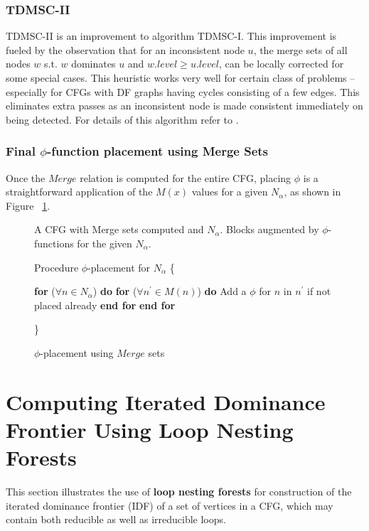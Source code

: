 \subsubsection{TDMSC-II}

TDMSC-II is an improvement to algorithm TDMSC-I. This improvement is fueled by the observation that for an inconsistent node $u$, the merge sets of all nodes $w$ s.t. $w$ dominates $u$ and $w.level \geq u.level$,
can be locally corrected for some special cases. This
heuristic works very well for certain class of problems -- especially for CFGs with DF graphs having cycles consisting of a few edges. This eliminates extra passes as an inconsistent node is made consistent immediately on being detected. For details of this algorithm refer to \cite{}.

\subsubsection { Final $\phi$-function placement using Merge Sets }
Once the $Merge$ relation is computed for the entire CFG, placing $\phi$ is a straightforward application of the $M(x)$ values for a given $N_{\alpha}$, as shown in Figure ~\ref{F:phip}.
\begin{figure}[!ht]
\centering
\begin{minipage}[t]{5in}
 A CFG with Merge sets computed and $N_{\alpha}$.
 Blocks augmented by $\phi$-functions for the given $N_{\alpha}$.

\setcounter{linectr}{0}

Procedure $\phi$-placement for $N_{\alpha}$
\{
\begin{code}
 {\bf for} ($\forall n \in N_{\alpha}$) {\bf do}
   {\bf for} ($\forall n^{'} \in M(n)$) {\bf do}
       Add a $\phi$ for $n$ in $n^{'}$ if not placed already
   {\bf end for}
 {\bf end for}
\end{code}
\}
\end{minipage}
\caption{$\phi$-placement using $Merge$ sets}
\label{F:phip}
\end{figure} 

\section{Computing Iterated Dominance Frontier Using Loop Nesting Forests}
\label{section:alternative_ssa_construction_algorithms:loop}
    This section illustrates the use of {\bf loop nesting forests} for construction of the iterated
    dominance frontier (IDF) of a set of vertices in a CFG, which may contain both reducible as well as
    irreducible loops.

